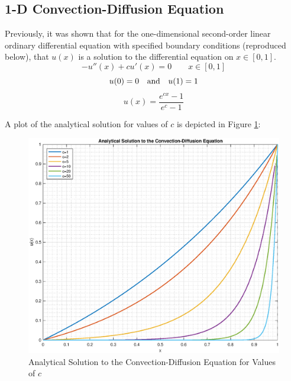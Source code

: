\documentclass[10pt]{article}		%
\numberwithin{equation}{section}
\begin{document}
\subsection{1-D Convection-Diffusion Equation}

Previously, it was shown that for the one-dimensional second-order linear ordinary differential equation with specified boundary conditions (reproduced below), that $u(x)$ is a solution to the differential equation on $x \in [0, 1]$.
\begin{equation}
-u''(x)+cu'(x)=0 \qquad x \in [0, 1]
\end{equation}
\begin{equation}
u(0) = 0 \quad \textnormal{and} \quad u(1) = 1 
\end{equation}
\begin{equation}
u(x) = \frac{e^{cx}-1}{e^c-1}
\end{equation}

A plot of the analytical solution for values of $c$ is depicted in Figure \ref{fig:analytical_conv_diff}:
\begin{figure}[H]
	\begin{center}
		\includegraphics[width = 0.95\linewidth]{analytical_solution_convection_diffusion}
		\caption{Analytical Solution to the Convection-Diffusion Equation for Values of $c$}
		\label{fig:analytical_conv_diff}
	\end{center}
\end{figure}

\newpage
\end{document}
